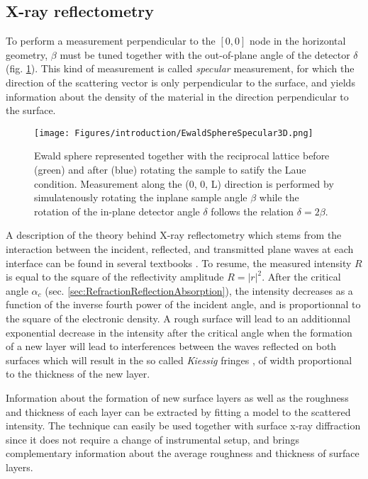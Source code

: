 \subsection{X-ray reflectometry}\label{sec:XRR}

To perform a measurement perpendicular to the $[0, 0]$ node in the horizontal geometry, $\beta$ must be tuned together with the out-of-plane angle of the detector $\delta$ (fig. \ref{fig:EwaldSphereSpecular}).
This kind of measurement is called \textit{specular} measurement, for which the direction of the scattering vector is only perpendicular to the surface, and yields information about the density of the material in the direction perpendicular to the surface.

\begin{figure}[!htb]
    \centering
    \texttt{[image: Figures/introduction/EwaldSphereSpecular3D.png]}
    \caption{
    Ewald sphere represented together with the reciprocal lattice before (green) and after (blue) rotating the sample to satify the Laue condition.
    Measurement along the (0, 0, L) direction is performed by simulatenously rotating the inplane sample angle $\beta$ while the rotation of the in-plane detector angle $\delta$ follows the relation $\delta=2\beta$.
    }
    \label{fig:EwaldSphereSpecular}
\end{figure}

A description of the theory behind X-ray reflectometry which stems from the interaction between the incident, reflected, and transmitted plane waves at each interface can be found in several textbooks \parencite{Willmott}.
To resume, the measured intensity $R$ is equal to the square of the reflectivity amplitude $R=|r|^2$.
After the critical angle $\alpha_c$ (sec. \ref{sec:RefractionReflectionAbsorption}), the intensity decreases as a function of the inverse fourth power of the incident angle, and is proportionnal to the square of the electronic density.
A rough surface will lead to an additionnal exponential decrease in the intensity after the critical angle when the formation of a new layer will lead to interferences between the waves reflected on both surfaces which will result in the so called \textit{Kiessig} fringes \parencite{Kiessig1931}, of width proportional to the thickness of the new layer.

Information about the formation of new surface layers as well as the roughness and thickness of each layer can be extracted by fitting a model to the scattered intensity.
The technique can easily be used together with surface x-ray diffraction since it does not require a change of instrumental setup, and brings complementary information about the average roughness and thickness of surface layers.